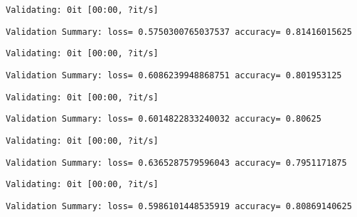 \documentclass[11pt]{article}
\begin{document}
    
    \begin{Verbatim}[commandchars=\\\{\}]
Validating: 0it [00:00, ?it/s]
    \end{Verbatim}

    
    \begin{Verbatim}[commandchars=\\\{\}]
Validation Summary: loss= 0.5750300765037537 accuracy= 0.81416015625
    \end{Verbatim}

    
    \begin{Verbatim}[commandchars=\\\{\}]
Validating: 0it [00:00, ?it/s]
    \end{Verbatim}

    
    \begin{Verbatim}[commandchars=\\\{\}]
Validation Summary: loss= 0.6086239948868751 accuracy= 0.801953125
    \end{Verbatim}

    
    \begin{Verbatim}[commandchars=\\\{\}]
Validating: 0it [00:00, ?it/s]
    \end{Verbatim}

    
    \begin{Verbatim}[commandchars=\\\{\}]
Validation Summary: loss= 0.6014822833240032 accuracy= 0.80625
    \end{Verbatim}

    
    \begin{Verbatim}[commandchars=\\\{\}]
Validating: 0it [00:00, ?it/s]
    \end{Verbatim}

    
    \begin{Verbatim}[commandchars=\\\{\}]
Validation Summary: loss= 0.6365287579596043 accuracy= 0.7951171875
    \end{Verbatim}

    
    \begin{Verbatim}[commandchars=\\\{\}]
Validating: 0it [00:00, ?it/s]
    \end{Verbatim}

    
    \begin{Verbatim}[commandchars=\\\{\}]
Validation Summary: loss= 0.5986101448535919 accuracy= 0.80869140625
    \end{Verbatim}
\end{document}
